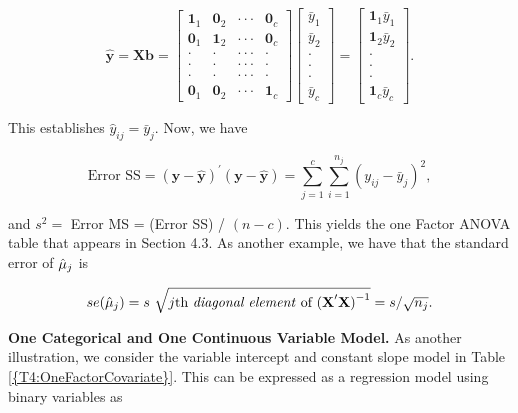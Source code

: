 \begin{center}
\[
\mathbf{\hat{y}}=\mathbf{Xb}=
\begin{bmatrix}
\mathbf{1}_1 & \mathbf{0}_2 & \cdot \cdot \cdot  & \mathbf{0}_c \\
\mathbf{0}_1 & \mathbf{1}_2 & \cdot \cdot \cdot  & \mathbf{0}_c \\
\cdot  & \cdot  & \cdot \cdot \cdot  & \cdot  \\
\cdot  & \cdot  & \cdot \cdot \cdot  & \cdot  \\
\cdot  & \cdot  & \cdot \cdot \cdot  & \cdot  \\
\mathbf{0}_1 & \mathbf{0}_2 & \cdot \cdot \cdot  & \mathbf{1}_c%
\end{bmatrix}
\begin{bmatrix}
\bar{y}_1 \\
\bar{y}_2 \\
\cdot  \\
\cdot  \\
\cdot  \\
\bar{y}_{c}%
\end{bmatrix}%
=%
\begin{bmatrix}
\mathbf{1}_1\bar{y}_1 \\
\mathbf{1}_2\bar{y}_2 \\
\cdot  \\
\cdot  \\
\cdot  \\
\mathbf{1}_{c}\bar{y}_{c}%
\end{bmatrix}%
.
\]
\end{center}

\noindent This establishes $\hat{y}_{ij}=\bar{y}_{j}$. Now, we have

\begin{center}
\[
\text{Error SS}=\mathbf{(y-\hat{y})^{\prime}(y-\hat{y})}=\sum_{j=1}^{c}%
\sum_{i=1}^{n_{j}}(y_{ij}-\bar{y}_{j})^{2},
\]
\end{center}

\noindent and $s^{2}=$ Error MS = (Error SS) / $(n-c)$. This yields
the one Factor ANOVA table that appears in Section 4.3. As
another example, we have that the standard error of $\hat{%
\mu}_{j}$ is

\begin{center}
\[
se(\hat{\mu}_{j})=s ~ \sqrt{j\text{th \textit{diagonal element} of }\mathbf{(X}%
^{\prime}\mathbf{X)}^{-1}}=s/\sqrt{n_{j}}.
\]
\end{center}

\textbf{One Categorical and One Continuous Variable Model.} As
another illustration, we consider the variable intercept and
constant slope model in Table \ref{{T4:OneFactorCovariate}}. This
can be expressed as a regression model using binary variables as

